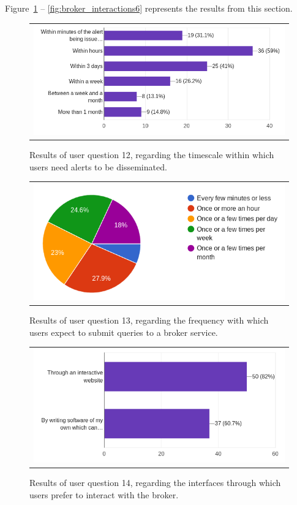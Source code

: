 \documentclass{article}
\begin{document}
Figure~\ref{fig:broker_interactions1} -- \ref{fig:broker_interactions6} represents the results from this section.  

\begin{figure}[ht]
\centering
\begin{tabular}{c}
\includegraphics[width=5in]{figures/user_question_12.png}
\end{tabular}
\caption{Results of user question 12, regarding the timescale within which users need alerts to be disseminated. }
\label{fig:broker_interactions1}
\end{figure}

\begin{figure}[ht]
\centering
\begin{tabular}{c}
\includegraphics[width=5in]{figures/user_question_13.png}
\end{tabular}
\caption{Results of user question 13, regarding the frequency with which users expect to submit queries to a broker service. }
\label{fig:broker_interactions2}
\end{figure}

\begin{figure}[ht]
\centering
\begin{tabular}{c}
\includegraphics[width=5in]{figures/user_question_14.png}
\end{tabular}
\caption{Results of user question 14, regarding the interfaces through which users prefer to interact with the broker. }
\label{fig:broker_interactions3}
\end{figure}
\end{document}
